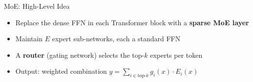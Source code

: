 \begin{frame}{MoE: High-Level Idea}
\begin{center}
  \end{center}

  \begin{itemize}
    \item Replace the dense FFN in each Transformer block with a \textbf{sparse MoE layer}
    \item Maintain $E$ expert sub-networks, each a standard FFN
    \item A \textbf{router} (gating network) selects the top-$k$ experts per token
    \item Output: weighted combination $y = \sum_{i \in \text{top-}k} g_i(x) \cdot E_i(x)$
  \end{itemize}
\end{frame}

